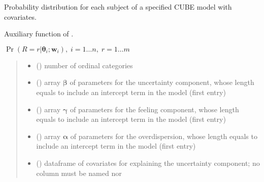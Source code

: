 \documentclass[letterpaper,10pt,english]{sphinxmanual}
\begin{document}
\begin{fulllineitems}
\label{\detokenize{cubmods:cubmods.cube_ywz.pmfi}}
\pysigstartsignatures
{}
\pysigstopsignatures
\sphinxAtStartPar
Probability distribution for each subject of a specified CUBE model 
with covariates.

\sphinxAtStartPar
Auxiliary function of .

\sphinxAtStartPar
\(\Pr(R = r | \pmb\theta_i ; \pmb w_i),\; i=1 \ldots n ,\; r=1 \ldots m\)
\begin{quote}\begin{description}
\begin{itemize}
\item {} 
\sphinxAtStartPar
{} () \textendash{} number of ordinal categories

\item {} 
\sphinxAtStartPar
{} () \textendash{} array \(\pmb \beta\) of parameters for the uncertainty component, whose length equals 
 to include an intercept term in the model (first entry)

\item {} 
\sphinxAtStartPar
{} () \textendash{} array \(\pmb \gamma\) of parameters for the feeling component, whose length equals 
 to include an intercept term in the model (first entry)

\item {} 
\sphinxAtStartPar
{} () \textendash{} array \(\pmb \alpha\) of parameters for the overdispersion, whose length equals 
 to include an intercept term in the model (first entry)

\item {} 
\sphinxAtStartPar
{} () \textendash{} dataframe of covariates for explaining the uncertainty component;
no column must be named  nor 


\end{itemize}
\end{description}
\end{quote}
\end{fulllineitems}
\end{document}
